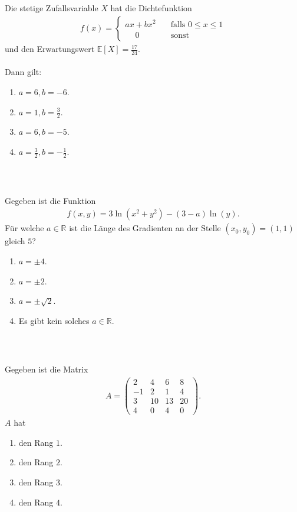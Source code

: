 \subsection*{}
Die stetige Zufallsvariable $ X $ hat die Dichtefunktion
\begin{align*}
f(x) =
\begin{cases}
ax + bx^2 \quad &\textrm{falls } 0 \leq x \leq 1\\
\quad  \  0 \ \ &\textrm{sonst}
\end{cases}
\end{align*}
und den Erwartungswert $ \mathbb{E}[X] = \frac{17}{24} $.\\
\\
Dann gilt:
\renewcommand{\labelenumi}{(\alph{enumi})}
\begin{enumerate}
	\item 
	$a= 6,b=-6$.
	\item
	$a= 1,b=\frac{3}{2}$.
	\item
	$a= 6,b=-5$.
	\item
	$a= \frac{3}{2},b=-\frac{1}{2}$.	
\end{enumerate}
\ \\
\subsection*{}
Gegeben ist die Funktion
\begin{align*}
f(x,y) = 3 \ln(x^2 + y^2) - (3-a) \ln(y).
\end{align*}
Für welche $ a \in \mathbb{R} $ ist die Länge des Gradienten an der Stelle  $ (x_0,y_0) = (1,1) $ gleich $ 5 $?
\renewcommand{\labelenumi}{(\alph{enumi})}
\begin{enumerate}
\item 
$ a = \pm 4 $.
\item
$ a = \pm 2 $.
\item
$ a = \pm \sqrt{2} $.
\item
Es gibt kein solches $ a \in \mathbb{R} $.
\end{enumerate}
\ \\
\subsection*{}
Gegeben ist die Matrix
\begin{align*}
A =
\begin{pmatrix}
2 & 4 & 6 & 8 \\
-1 & 2 & 1 & 4 \\
3 & 10 & 13 &  20 \\
4 & 0 & 4 & 0
\end{pmatrix}.
\end{align*}
$ A $ hat
\renewcommand{\labelenumi}{(\alph{enumi})}
\begin{enumerate}
\item 
den Rang $ 1 $.
\item 
den Rang $ 2 $.
\item
den Rang $ 3 $.
\item
den Rang $ 4 $.
\end{enumerate}
\ \\
